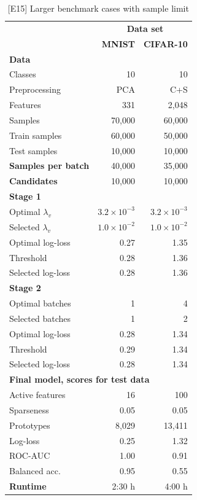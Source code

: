 \begin{table}
\caption{[E15] Larger benchmark cases with sample limit}
\label{tab_e15}
%
\begin{center}
\small
\begin{tabular}{|lrr|}
\hline
&\multicolumn{2}{c|}{\textbf{\hrulefill\ Data set \hrulefill}}\\
&\textbf{MNIST}&\textbf{CIFAR-10}\\
\multicolumn{3}{|l|}{\textbf{Data}}\\
Classes&10&10\\
Preprocessing&PCA&C+S\\
Features&331&2,048\\
Samples&70,000&60,000\\
Train samples&60,000&50,000\\
Test samples&10,000&10,000\\
\textbf{Samples per batch}&40,000&35,000\\
\textbf{Candidates}&10,000&10,000\\
\multicolumn{3}{|l|}{\textbf{Stage 1}}\\
Optimal $\lambda_v$&$3.2\times10^{-3}$&$3.2\times10^{-3}$\\
Selected $\lambda_v$&$1.0\times10^{-2}$&$1.0\times10^{-2}$\\
Optimal log-loss&0.27&1.35\\
Threshold&0.28&1.36\\
Selected log-loss&0.28&1.36\\
\multicolumn{3}{|l|}{\textbf{Stage 2}}\\
Optimal batches&1&4\\
Selected batches&1&2\\
Optimal log-loss&0.28&1.34\\
Threshold&0.29&1.34\\
Selected log-loss&0.28&1.34\\
\multicolumn{3}{|l|}{\textbf{Final model, scores for test data}}\\
Active features&16&100\\
Sparseness&0.05&0.05\\
Prototypes&8,029&13,411\\
Log-loss&0.25&1.32\\
ROC-AUC&1.00&0.91\\
Balanced acc.&0.95&0.55\\
\textbf{Runtime}&2:30 h&4:00 h\\
\hline
\end{tabular}
\end{center}
\end{table}
